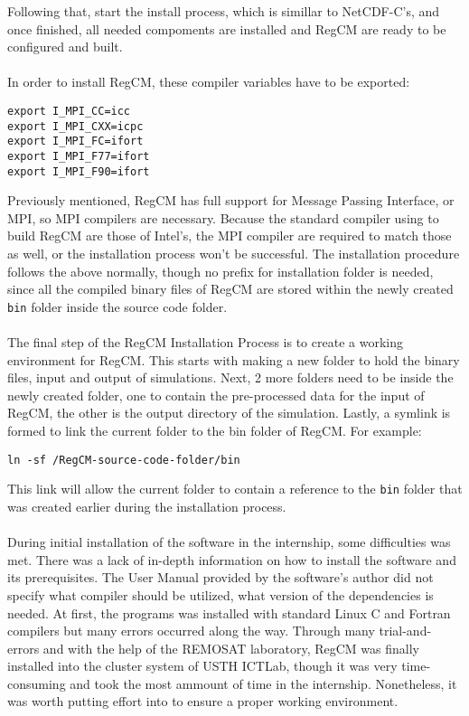 Following that, start the install process, which is simillar to NetCDF-C's, and once finished, all needed compoments are installed and RegCM are ready to be configured and built. \\
~\\
In order to install RegCM, these compiler variables have to be exported:
\begin{center}
\begin{BVerbatim}
export I_MPI_CC=icc
export I_MPI_CXX=icpc
export I_MPI_FC=ifort
export I_MPI_F77=ifort
export I_MPI_F90=ifort
\end{BVerbatim}
\end{center}
Previously mentioned, RegCM has full support for Message Passing Interface, or MPI, so MPI compilers are necessary. Because the standard compiler using to build RegCM are those of Intel's, the MPI compiler are required to match those as well, or the installation process won't be successful. The installation procedure follows the above normally, though no prefix for installation folder is needed, since all the compiled binary files of RegCM are stored within the newly created \verb|bin| folder inside the source code folder. \\
~\\
The final step of the RegCM Installation Process is to create a working environment for RegCM. This starts with making a new folder to hold the binary files, input and output of simulations. Next, 2 more folders need to be inside the newly created folder, one to contain the pre-processed data for the input of RegCM, the other is the output directory of the simulation. Lastly, a symlink is formed to link the current folder to the bin folder of RegCM. For example:
\begin{center}
\begin{BVerbatim}
ln -sf /RegCM-source-code-folder/bin
\end{BVerbatim}
\end{center}
This link will allow the current folder to contain a reference to the \verb|bin| folder that was created earlier during the installation process. \\
~\\
During initial installation of the software in the internship, some difficulties was met. There was a lack of in-depth information on how to install the software and its prerequisites. The User Manual provided by the software's author did not specify what compiler should be utilized, what version of the dependencies is needed. At first, the programs was installed with standard Linux C and Fortran compilers but many errors occurred along the way. Through many trial-and-errors and with the help of the REMOSAT laboratory, RegCM was finally installed into the cluster system of USTH ICTLab, though it was very time-consuming and took the most ammount of time in the internship. Nonetheless, it was worth putting effort into to ensure a proper working environment. \\

